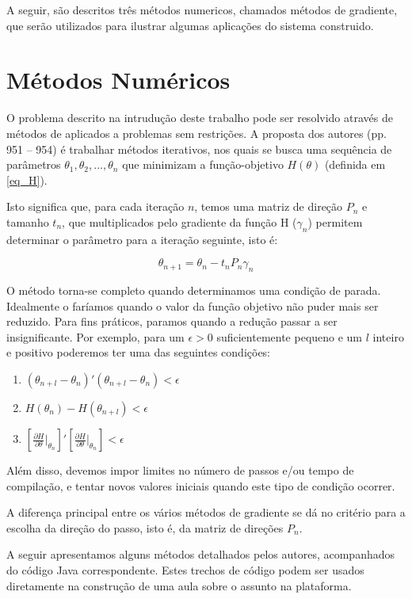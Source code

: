 \documentclass{abnt}
\begin{document}
A seguir, são descritos três métodos numericos, chamados métodos de gradiente, que serão utilizados para ilustrar algumas aplicações do sistema construido.

\section {Métodos Numéricos}

	O problema descrito na intrudução deste trabalho pode ser resolvido através de métodos de aplicados a problemas sem restrições. A proposta dos autores (pp. 951 -- 954) é trabalhar métodos iterativos, nos quais se busca uma sequência de parâmetros $\theta_{1}, \theta_{2}, ... , \theta_{n}$ que minimizam a função-objetivo  $H(\theta)$ (definida em \ref{eq_H}).

Isto significa que, para cada iteração $n$, temos uma matriz de direção $P_{n}$ e tamanho $t_{n}$, que multiplicados pelo gradiente da função H ($\gamma_{n}$) permitem determinar o parâmetro para a iteração seguinte, isto é:

\[ \theta_{n+1} = \theta_{n} - t_{n}P_{n}\gamma_{n} \]

	O método torna-se completo quando determinamos uma condição de parada. Idealmente o faríamos quando o valor da função objetivo não puder mais ser reduzido. Para fins práticos, paramos quando a redução passar a ser insignificante. Por exemplo,  para um $\epsilon > 0$ suficientemente pequeno e um $l$ inteiro e positivo poderemos ter uma das seguintes condições:

\begin{enumerate}
\item $ ( \theta_{n+l} - \theta_n )'( \theta_{n+l} - \theta_n ) < \epsilon$
\item $ H(  \theta_n )- H (\theta_{n+l} ) < \epsilon$
\item $  [\frac{\partial H}{\partial \theta}\vert_{\theta_n}]'[\frac{\partial H}{\partial \theta}\vert_{\theta_n}] < \epsilon$
\end{enumerate}

Além disso, devemos impor limites no número de passos e/ou tempo de compilação, e tentar novos valores iniciais quando este tipo de condição ocorrer.

A diferença principal entre os vários métodos de gradiente se dá no critério para a escolha da direção do passo, isto é, da matriz de direções $P_n$.

A seguir apresentamos alguns métodos detalhados pelos autores, acompanhados do código Java correspondente. Estes trechos de código podem ser usados diretamente na construção de uma aula sobre o assunto na plataforma.
\end{document}
